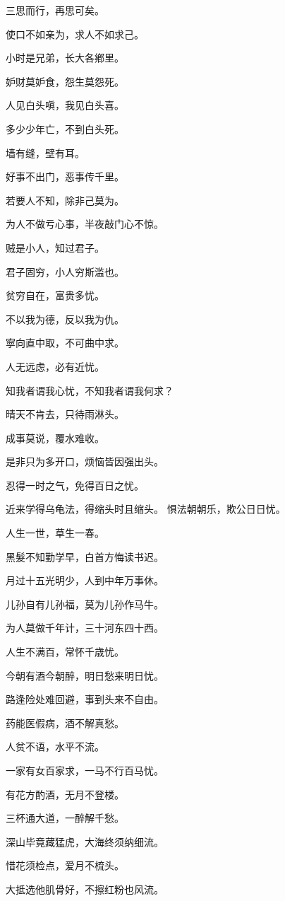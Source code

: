 \documentclass[12pt,oneside]{book}
\begin{document}
三思而行，再思可矣。

使口不如亲为，求人不如求己。

小时是兄弟，长大各鄕里。

妒财莫妒食，怨生莫怨死。

人见白头嗔，我见白头喜。

多少少年亡，不到白头死。

墙有缝，壁有耳。

好事不出门，恶事传千里。

若要人不知，除非己莫为。

为人不做亏心事，半夜敲门心不惊。

贼是小人，知过君子。

君子固穷，小人穷斯滥也。

贫穷自在，富贵多忧。

不以我为德，反以我为仇。

寧向直中取，不可曲中求。

人无远虑，必有近忧。

知我者谓我心忧，不知我者谓我何求？

晴天不肯去，只待雨淋头。

成事莫说，覆水难收。

是非只为多开口，烦恼皆因强出头。

忍得一时之气，免得百日之忧。

近来学得乌龟法，得缩头时且缩头。
惧法朝朝乐，欺公日日忧。


人生一世，草生一春。

黑髮不知勤学早，白首方悔读书迟。

月过十五光明少，人到中年万事休。

儿孙自有儿孙福，莫为儿孙作马牛。

为人莫做千年计，三十河东四十西。

人生不满百，常怀千歳忧。

今朝有酒今朝醉，明日愁来明日忧。

路逢险处难回避，事到头来不自由。

药能医假病，酒不解真愁。

人贫不语，水平不流。

一家有女百家求，一马不行百马忧。

有花方酌酒，无月不登楼。

三杯通大道，一醉解千愁。

深山毕竟藏猛虎，大海终须纳细流。

惜花须检点，爱月不梳头。

大抵选他肌骨好，不擦红粉也风流。
\end{document}
